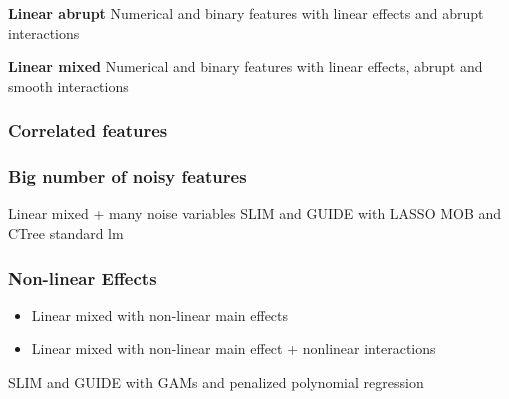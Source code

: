 \textbf{Linear abrupt}
Numerical and binary features with linear effects and abrupt interactions

\textbf{Linear mixed}
Numerical and binary features with linear effects, abrupt and smooth interactions

\subsubsection{Correlated features}

\subsubsection{Big number of noisy features}
Linear mixed + many noise variables
SLIM and GUIDE with LASSO
MOB and CTree standard lm

\subsubsection{Non-linear Effects}
\begin{itemize}
    \item Linear mixed with non-linear main effects
    \item Linear mixed with non-linear main effect + nonlinear interactions
\end{itemize}

SLIM and GUIDE with GAMs and penalized polynomial regression


